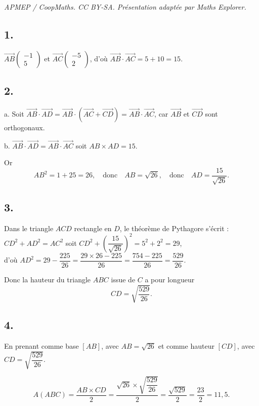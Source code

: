 \documentclass[10pt]{article}
\begin{document}
\noindent\textit{APMEP / CoopMaths. CC BY-SA. Présentation adaptée par Maths Explorer.}\par\medskip
\subsection*{1.}
	
	\(\overrightarrow{AB} \left( \begin{array}{c} -1 \\ 5 \end{array} \right)\) et \(\overrightarrow{AC} \left( \begin{array}{c} -5 \\ 2 \end{array} \right)\), d’où \(\overrightarrow{AB} \cdot \overrightarrow{AC} = 5 + 10 = 15\).
	
	\subsection*{2.}
	
	a. Soit \(\overrightarrow{AB} \cdot \overrightarrow{AD} = \overrightarrow{AB} \cdot (\overrightarrow{AC} + \overrightarrow{CD}) = \overrightarrow{AB} \cdot \overrightarrow{AC}\), car \(\overrightarrow{AB}\) et \(\overrightarrow{CD}\) sont orthogonaux.
	
	b. \(\overrightarrow{AB} \cdot \overrightarrow{AD} = \overrightarrow{AB} \cdot \overrightarrow{AC}\) soit \(AB \times AD = 15\).
	
	Or
	\[
	AB^2 = 1 + 25 = 26, \quad \text{donc} \quad AB = \sqrt{26}, \quad \text{donc} \quad AD = \dfrac{15}{\sqrt{26}}.
	\]
	
	\subsection*{3.}
	
	Dans le triangle \(ACD\) rectangle en \(D\), le théorème de Pythagore s’écrit :\\
$
	CD^2 + AD^2 = AC^2$  soit $ CD^2 + \left(\dfrac{15}{\sqrt{26}}\right)^2 = 5^2 + 2^2 = 29$, \\
	 d’où $ AD^2 = 29 - \dfrac{225}{26} = \dfrac{29 \times 26 - 225}{26} = \dfrac{754 - 225}{26} = \dfrac{529}{26}.$
	
	Donc la hauteur du triangle \(ABC\) issue de \(C\) a pour longueur
	\[
	CD = \sqrt{\dfrac{529}{26}}.
	\]
	
	\subsection*{4.}
	
	En prenant comme base \([AB]\), avec \(AB = \sqrt{26}\) et comme hauteur \([CD]\), avec \(CD = \sqrt{\dfrac{529}{26}}\).
	
	\[
	A(ABC) = \dfrac{AB \times CD}{2} = \dfrac{\sqrt{26} \times \sqrt{\dfrac{529}{26}}}{2} = \dfrac{\sqrt{529}}{2} = \dfrac{23}{2} = 11,5.
	\]
\end{document}
